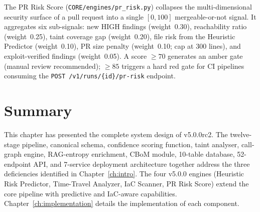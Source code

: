 The PR Risk Score (\texttt{CORE/engines/pr\_risk.py}) collapses the multi-dimensional security surface of a pull request into a single $[0, 100]$ mergeable-or-not signal. It aggregates six sub-signals: new HIGH findings (weight~0.30), reachability ratio (weight~0.25), taint coverage gap (weight~0.20), file risk from the Heuristic Predictor (weight~0.10), PR size penalty (weight~0.10; cap at 300 lines), and exploit-verified findings (weight~0.05). A score $\geq 70$ generates an amber gate (manual review recommended); $\geq 85$ triggers a hard red gate for CI pipelines consuming the \texttt{POST /v1/runs/\{id\}/pr-risk} endpoint.

\section{Summary}

This chapter has presented the complete system design of \ACRQA{} v5.0.0rc2. The twelve-stage pipeline, canonical schema, confidence scoring function, taint analyser, call-graph engine, RAG-entropy enrichment, CBoM module, 10-table database, 52-endpoint API, and 7-service deployment architecture together address the three deficiencies identified in Chapter~\ref{ch:intro}. The four v5.0.0 engines (Heuristic Risk Predictor, Time-Travel Analyzer, IaC Scanner, PR Risk Score) extend the core pipeline with predictive and IaC-aware capabilities. Chapter~\ref{ch:implementation} details the implementation of each component.

\clearpage
